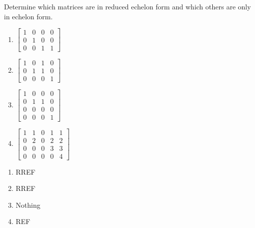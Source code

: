 \documentclass{mathhomework}
\begin{document}
\begin{problem}[1.2\#1]
    Determine which matrices are in reduced echelon form and which others are only in echelon form.
    \begin{enumerate}[label=(\alph*)]
        \item $\begin{bmatrix}
            1 & 0 & 0 & 0 \\
            0 & 1 & 0 & 0 \\
            0 & 0 & 1 & 1
        \end{bmatrix}$
        \item $\begin{bmatrix}
            1 & 0 & 1 & 0 \\
            0 & 1 & 1 & 0 \\
            0 & 0 & 0 & 1
        \end{bmatrix}$
        \item $\begin{bmatrix}
            1 & 0 & 0 & 0 \\
            0 & 1 & 1 & 0 \\
            0 & 0 & 0 & 0 \\
            0 & 0 & 0 & 1
        \end{bmatrix}$
        \item $\begin{bmatrix}
            1 & 1 & 0 & 1 & 1 \\
            0 & 2 & 0 & 2 & 2 \\
            0 & 0 & 0 & 3 & 3 \\
            0 & 0 & 0 & 0 & 4
        \end{bmatrix}$
    \end{enumerate}

    \begin{solution}
        \begin{enumerate}[label=(\alph*)]
            \item RREF
            \item RREF
            \item Nothing
            \item REF
        \end{enumerate}
    \end{solution}
\end{problem}
\end{document}

